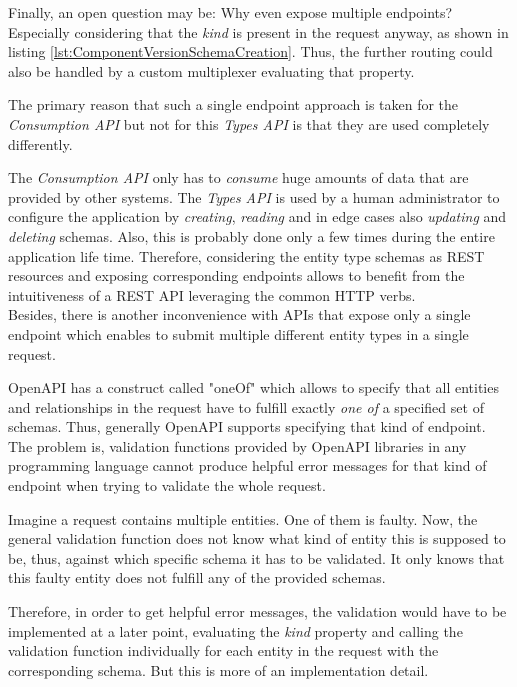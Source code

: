 Finally, an open question may be: Why even expose multiple endpoints? Especially considering that the \emph{kind} is present in the request anyway, as shown in listing \ref{lst:ComponentVersionSchemaCreation}. Thus, the further routing could also be handled by a custom multiplexer evaluating that property.\par
The primary reason that such a single endpoint approach is taken for the \emph{Consumption API} but not for this \emph{Types API} is that they are used completely differently.\par
The \emph{Consumption API} only has to \emph{consume} huge amounts of data that are provided by other systems. The \emph{Types API} is used by a human administrator to configure the application by \emph{creating}, \emph{reading} and in edge cases also \emph{updating} and \emph{deleting} schemas. Also, this is probably done only a few times during the entire application life time. Therefore, considering the entity type schemas as REST resources and exposing corresponding endpoints allows to benefit from the intuitiveness of a REST API leveraging the common HTTP verbs.\\

Besides, there is another inconvenience with APIs that expose only a single endpoint which enables to submit multiple different entity types in a single request.\par 
OpenAPI has a construct called "oneOf" which allows to specify that all entities and relationships in the request have to fulfill exactly \emph{one of} a specified set of schemas. Thus, generally OpenAPI supports specifying that kind of endpoint. The problem is, validation functions provided by OpenAPI libraries in any programming language cannot produce helpful error messages for that kind of endpoint when trying to validate the whole request.\par 
Imagine a request contains multiple entities. One of them is faulty. Now, the general validation function does not know what kind of entity this is supposed to be, thus, against which specific schema it has to be validated. It only knows that this faulty entity does not fulfill any of the provided schemas.\par
Therefore, in order to get helpful error messages, the validation would have to be implemented at a later point, evaluating the \emph{kind} property and calling the validation function individually for each entity in the request with the corresponding schema. But this is more of an implementation detail.

